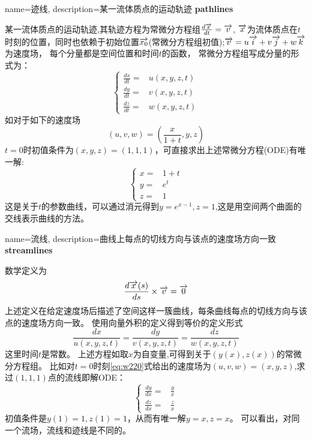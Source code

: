 {
  name=迹线,
  description={某一流体质点的运动轨迹}
}
\textbf{\gls{pathlines}}

某一流体质点的运动轨迹,其轨迹方程为常微分方程组$\frac{d \overrightarrow{x}}{d t}=\overrightarrow{v}$,
$\overrightarrow{x}$为流体质点在$t$时刻的位置，同时也依赖于初始位置$\overrightarrow{x_0}$(常微分方程组初值);$\overrightarrow{v}=u\overrightarrow{i}+v\overrightarrow{j}+w\overrightarrow{k}$为速度场，
每个分量都是空间位置和时间$t$的函数，
常微分方程组写成分量的形式为：
\begin{equation}\label{eq:22tr}
\begin{cases}
\frac{dx}{dt}=&u(x,y,z,t)\\
\frac{dy}{dt}=&v(x,y,z,t)\\
\frac{dz}{dt}=&w(x,y,z,t)
\end{cases}
\end{equation}
如对于如下的速度场
\begin{equation}\label{eq:w220}
(u,v,w)=(\frac{x}{1+t},y,z)
\end{equation}
$t=0$时初值条件为$(x,y,z)=(1,1,1)$，可直接求出上述常微分方程(ODE)有唯一解:
\begin{equation}
\begin{cases}
x=&1+t\\
y=&e^t\\
z=&1
\end{cases}
\end{equation}
这是关于$t$的参数曲线，可以通过消元得到$y=e^{x-1},z=1$,这是用空间两个曲面的交线表示曲线的方法。

{
  name=流线,
  description={曲线上每点的切线方向与该点的速度场方向一致}
}
\textbf{\gls{streamlines}}

数学定义为
\begin{equation}
\frac{d \overrightarrow{x}(s)}{d s}\times \overrightarrow{v} =\overrightarrow{0}
\end{equation}
上述定义在给定速度场后描述了空间这样一簇曲线，每条曲线每点的切线方向与该点的速度场方向一致。
使用向量外积的定义得到等价的定义形式
\begin{equation}\label{eq:2222st}
\frac{dx}{u(x,y,z,t)}=\frac{dy}{v(x,y,z,t)}=\frac{dz}{w(x,y,z,t)}
\end{equation}
这里时间$t$是常数。
上述方程如取$x$为自变量,可得到关于$(y(x),z(x))$的常微分方程组。
比如对$t=0$时刻\eqref{eq:w220}式给出的速度场为$(u,v,w)=(x,y,z)$,求过$(1,1,1)$点的流线即解ODE：
\begin{equation}
\begin{cases}
\frac{dy}{dx}=&\frac{y}{x}\\
\frac{dz}{dx}=&\frac{z}{x}
\end{cases}
\end{equation}
初值条件是$y(1)=1,z(1)=1$，从而有唯一解$y=x,z=x$。
可以看出，对同一个流场，流线和迹线是不同的。

